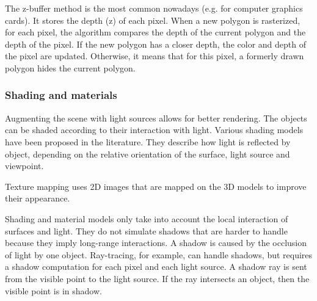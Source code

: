 The z-buffer method is the most common nowadays (e.g. for computer graphics cards). It stores the depth (z) of each pixel. When a new polygon is rasterized, for each pixel, the algorithm compares the depth of the current polygon and the depth of the pixel. If the new polygon has a closer depth, the color and depth of the pixel  are  updated.  Otherwise,  it  means  that  for  this  pixel,  a  formerly  drawn  polygon  hides  the  current polygon.

\subsubsection{Shading and materials}

Augmenting  the  scene  with  light  sources  allows  for  better  rendering.  The  objects  can  be  
shaded according to their interaction with light. Various shading models have been proposed in the literature. They describe how light is reflected by object, depending on the relative orientation of the surface, light source and viewpoint.

Texture  mapping uses  2D  images  that  are  mapped  on  the  3D  models  to  improve  their  appearance.

Shading and material models only take into account the local interaction of surfaces and light. They do 
not simulate shadows that  are  harder  to  handle  because  they  imply  long-range interactions. A shadow is caused by the occlusion of light by one object. Ray-tracing,  for  example,  can  handle  shadows,  but  requires  a  shadow  computation  for  each  pixel  and  each  light  source.  A  shadow ray is sent from the visible point to the light source. If the ray intersects an object, then the visible point is in shadow.

\begin{figure}[H]
\centering
{}
\end{figure}  

